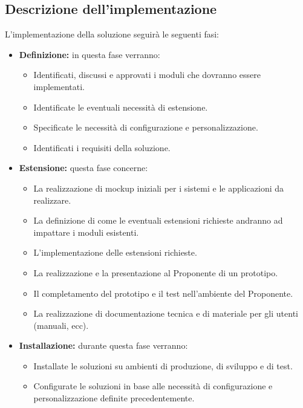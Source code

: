         \subsection{Descrizione dell'implementazione}
			L'implementazione della soluzione seguirà le seguenti fasi:
            \begin{itemize}
            	\item \textbf{Definizione:} in questa fase verranno:
                \begin{itemize} 
                	\item Identificati, discussi e approvati i moduli che dovranno essere implementati.
                    \item Identificate le eventuali necessità di estensione.
                    \item Specificate le necessità di configurazione e personalizzazione.
                    \item Identificati i requisiti della soluzione.
                \end{itemize}
                \item \textbf{Estensione:} questa fase concerne:
                \begin{itemize}
                	\item La realizzazione di mockup iniziali per i sistemi e le applicazioni da realizzare.
                    \item La definizione di come le eventuali estensioni richieste andranno ad impattare i moduli esistenti.
                    \item L'implementazione delle estensioni richieste.
                    \item La realizzazione e la presentazione al Proponente di un prototipo.
                    \item Il completamento del prototipo e il test nell'ambiente del Proponente.
                    \item La realizzazione di documentazione tecnica e di materiale per gli utenti (manuali, ecc).
                \end{itemize}
                \item \textbf{Installazione:} durante questa fase verranno:
                \begin{itemize}
                	\item Installate le soluzioni su ambienti di produzione, di sviluppo e di test.
                    \item Configurate le soluzioni in base alle necessità di configurazione e personalizzazione definite precedentemente.

\end{itemize}
\end{itemize}
